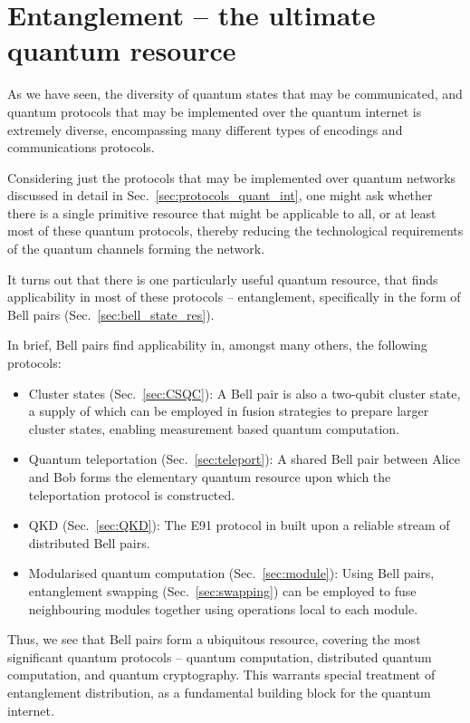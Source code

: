 \documentclass[aps,rmp,twocolumn,amsmath,amssymb,nofootinbib,superscriptaddress,longbibliography,floatfix]{revtex4-1}
\begin{document}
%
%

\section{Entanglement -- the ultimate quantum resource}

As we have seen, the diversity of quantum states that may be communicated, and quantum protocols that may be implemented over the quantum internet is extremely diverse, encompassing many different types of encodings and communications protocols.

Considering just the protocols that may be implemented over quantum networks discussed in detail in Sec.~\ref{sec:protocols_quant_int}, one might ask whether there is a single primitive resource that might be applicable to all, or at least most of these quantum protocols, thereby reducing the technological requirements of the quantum channels forming the network.

It turns out that there is one particularly useful quantum resource, that finds applicability in most of these protocols -- entanglement, specifically in the form of Bell pairs (Sec.~\ref{sec:bell_state_res}).

In brief, Bell pairs find applicability in, amongst many others, the following protocols:
\begin{itemize}
\item Cluster states (Sec.~\ref{sec:CSQC}): A Bell pair is also a two-qubit cluster state, a supply of which can be employed in fusion strategies to prepare larger cluster states, enabling measurement based quantum computation.
\item Quantum teleportation (Sec.~\ref{sec:teleport}): A shared Bell pair between Alice and Bob forms the elementary quantum resource upon which the teleportation protocol is constructed.
\item QKD (Sec.~\ref{sec:QKD}): The E91 protocol in built upon a reliable stream of distributed Bell pairs.
\item Modularised quantum computation (Sec.~\ref{sec:module}): Using Bell pairs, entanglement swapping (Sec.~\ref{sec:swapping}) can be employed to fuse neighbouring modules together using operations local to each module.
\end{itemize}

Thus, we see that Bell pairs form a ubiquitous resource, covering the most significant quantum protocols -- quantum computation, distributed quantum computation, and quantum cryptography. This warrants special treatment of entanglement distribution, as a fundamental building block for the quantum internet.
\end{document}
